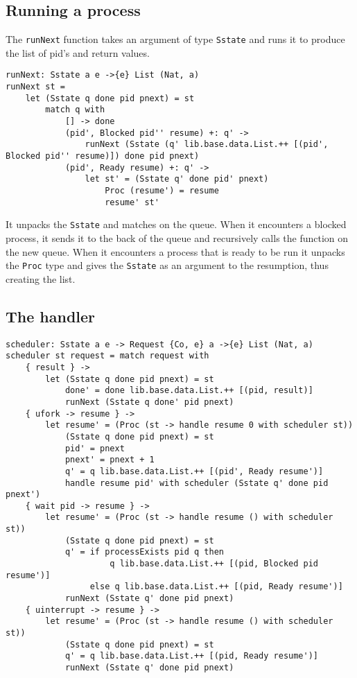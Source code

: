 \documentclass[logo,bsc,singlespacing,parskip]{infthesis}
\begin{document}
\subsection{Running a process}

The \texttt{runNext} function takes an argument of type \texttt{Sstate} and
runs it to produce the list of pid's and return values.

\begin{lstlisting}[language=unison]
runNext: Sstate a e ->{e} List (Nat, a)
runNext st =
    let (Sstate q done pid pnext) = st
        match q with
            [] -> done
            (pid', Blocked pid'' resume) +: q' -> 
                runNext (Sstate (q' lib.base.data.List.++ [(pid', Blocked pid'' resume)]) done pid pnext)
            (pid', Ready resume) +: q' -> 
                let st' = (Sstate q' done pid' pnext)
                    Proc (resume') = resume
                    resume' st'
\end{lstlisting}

It unpacks the \texttt{Sstate} and matches on the queue. When it encounters a
blocked process, it sends it to the back of the queue and recursively calls the
function on the new queue. When it encounters a process that is ready to be run
it unpacks the \texttt{Proc} type and gives the \texttt{Sstate} as an argument
to the resumption, thus creating the list.

\subsection{The handler}

\begin{lstlisting}[language=unison]
scheduler: Sstate a e -> Request {Co, e} a ->{e} List (Nat, a)
scheduler st request = match request with 
    { result } -> 
        let (Sstate q done pid pnext) = st 
            done' = done lib.base.data.List.++ [(pid, result)]
            runNext (Sstate q done' pid pnext)
    { ufork -> resume } -> 
        let resume' = (Proc (st -> handle resume 0 with scheduler st))
            (Sstate q done pid pnext) = st
            pid' = pnext
            pnext' = pnext + 1
            q' = q lib.base.data.List.++ [(pid', Ready resume')]
            handle resume pid' with scheduler (Sstate q' done pid pnext')
    { wait pid -> resume } -> 
        let resume' = (Proc (st -> handle resume () with scheduler st))
            (Sstate q done pid pnext) = st
            q' = if processExists pid q then
                     q lib.base.data.List.++ [(pid, Blocked pid resume')]
                 else q lib.base.data.List.++ [(pid, Ready resume')]
            runNext (Sstate q' done pid pnext)
    { uinterrupt -> resume } -> 
        let resume' = (Proc (st -> handle resume () with scheduler st))
            (Sstate q done pid pnext) = st
            q' = q lib.base.data.List.++ [(pid, Ready resume')]
            runNext (Sstate q' done pid pnext)
\end{lstlisting}
\end{document}
